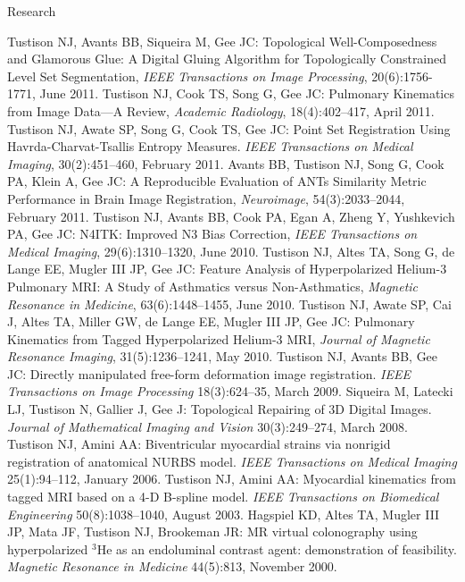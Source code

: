\documentclass{resume}
\begin{document}
\begin{category}{Research}
\begin{itemize}
    \citemnobullet Tustison NJ, Avants BB, Siqueira M, Gee JC:  Topological Well-Composedness and Glamorous Glue:  A Digital Gluing Algorithm for Topologically Constrained Level Set Segmentation, {\em IEEE Transactions on Image Processing}, 20(6):1756-1771, June 2011.
    \citemnobullet Tustison NJ, Cook TS, Song G, Gee JC:  Pulmonary Kinematics from Image Data---A Review, {\em Academic Radiology}, 18(4):402--417, April 2011.
    \citemnobullet Tustison NJ, Awate SP, Song G, Cook TS, Gee JC:  Point Set Registration Using Havrda-Charvat-Tsallis Entropy Measures. {\em IEEE Transactions on Medical Imaging}, 30(2):451--460, February 2011.
    \citemnobullet Avants BB, Tustison NJ, Song G, Cook PA, Klein A, Gee JC:  A Reproducible Evaluation of ANTs Similarity Metric Performance in Brain Image Registration, {\em Neuroimage}, 54(3):2033--2044, February 2011.
    \citemnobullet Tustison NJ, Avants BB, Cook PA, Egan A, Zheng Y, Yushkevich PA, Gee JC:  N4ITK:  Improved N3 Bias Correction, {\em IEEE Transactions on Medical Imaging}, 29(6):1310--1320, June 2010.
    \citemnobullet Tustison NJ, Altes TA, Song G, de Lange EE, Mugler III JP, Gee JC:  Feature Analysis of Hyperpolarized Helium-3 Pulmonary MRI:  A Study of Asthmatics versus Non-Asthmatics, {\em Magnetic Resonance in Medicine}, 63(6):1448--1455, June 2010.
    \citemnobullet Tustison NJ, Awate SP, Cai J, Altes TA, Miller GW, de Lange EE, Mugler III JP, Gee JC:  Pulmonary Kinematics from Tagged Hyperpolarized Helium-3 MRI, {\em Journal of Magnetic Resonance Imaging}, 31(5):1236--1241, May 2010.
    \citemnobullet Tustison NJ, Avants BB, Gee JC: Directly manipulated free-form deformation image registration. {\em IEEE Transactions on Image Processing} 18(3):624--35, March 2009.
    \citemnobullet Siqueira M, Latecki LJ, Tustison N, Gallier J, Gee J: Topological Repairing of 3D Digital Images. {\em Journal of Mathematical Imaging and Vision} 30(3):249--274, March 2008.
    \citemnobullet Tustison NJ, Amini AA: Biventricular myocardial strains via nonrigid registration of anatomical NURBS model. {\em IEEE Transactions on Medical Imaging} 25(1):94--112, January 2006.
    \citemnobullet Tustison NJ, Amini AA: Myocardial kinematics from tagged MRI based on a 4-D B-spline model. {\em IEEE Transactions on Biomedical Engineering} 50(8):1038--1040, August 2003.
    \citemnobullet Hagspiel KD, Altes TA, Mugler III JP, Mata JF, Tustison NJ, Brookeman JR: MR virtual colonography using hyperpolarized $^3$He as an endoluminal contrast agent: demonstration of feasibility. {\em Magnetic Resonance in Medicine} 44(5):813, November 2000.
   \end{itemize}


\end{category}
\end{document}
